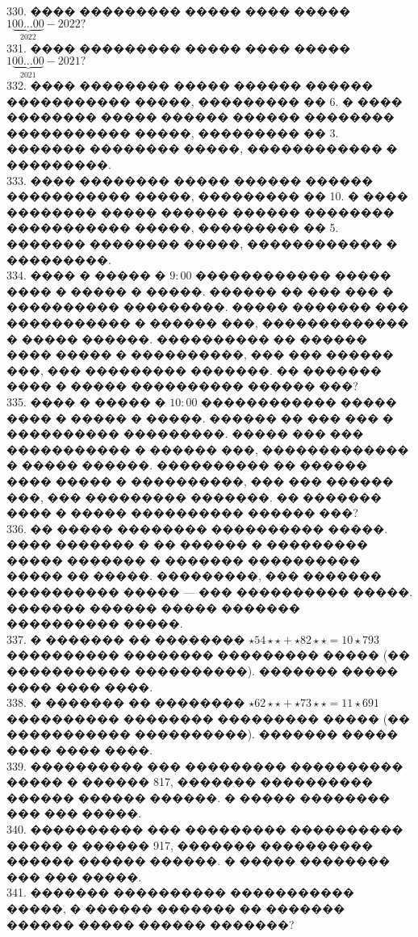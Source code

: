 \documentclass[12pt]{article}
\begin{document}
330. ���� ��������� ����� ���� ����� $1\underbrace{00\ldots00}_{2022}-2022?$\\
331. ���� ��������� ����� ���� ����� $1\underbrace{00\ldots00}_{2021}-2021?$\\
332. ���� �������� ����� ������ ������ ����������� �����, ��������� �� 6. � ���� �������� ����� ������ ������ �������� ����������� �����, ��������� �� 3. ������� �������� �����, ������������ � ���������.\\
333. ���� �������� ����� ������ ������ ����������� �����, ��������� �� 10. � ���� �������� ����� ������ ������ �������� ����������� �����, ��������� �� 5. ������� �������� �����, ������������ � ���������.\\
334. ���� � ����� � $9:00$ ������������ ����� ���� � ����� � �����. ������ �� ��� ��� � ���������� ���������. ����� ������� ��� ����������� � ������ ���, ������������� � ����� ������. ���������� �� ������ ���� ����� � ����������, ��� ��� ������ ���, ��� ��������� �������. �� ������� ���� � ����� ���������� ������ ���?\\
335. ���� � ����� � $10:00$ ������������ ����� ���� � ����� � �����. ������ �� ��� ��� � ���������� ���������. ����� ��� ��� ����������� � ������ ���, ������������� � ����� ������. ���������� �� ������ ���� ����� � ����������, ��� ��� ������ ���, ��� ��������� �������. �� ������� ���� � ����� ���������� ������ ���?\\
336. �� ����� �������� ���������� �����. ���� ������� � �� ������ � ��������� ����� ������� � ������� ���������� ����� �� �����. ���������, ��� ������� ���������� ����� --- ��� ���������� �����. ������� ������ ����� ������� ���������� �����.\\
337. � ������� �� �������� $\star54\star\star+\star82\star\star=10\star793$ ���������� �������� ��������� ����� (�� ����������� ����������). ������� ����� ���� ���� ����.\\
338. � ������� �� �������� $\star62\star\star+\star73\star\star=11\star691$ ���������� �������� ��������� ����� (�� ����������� ����������). ������� ����� ���� ���� ����.\\
339. ���������� ��� ��������� ���������� ����� � ������ 817, ������� ���������� ������ ������ ������. � ����� �������� ��� ��� �����.\\
340. ���������� ��� ��������� ���������� ����� � ������ 917, ������� ���������� ������ ������ ������. � ����� �������� ��� ��� �����.\\
341. ������� ���������� ����������� �����, � ������ ������� �� ������� ������ ����� ������ �������?\\
\end{document}
